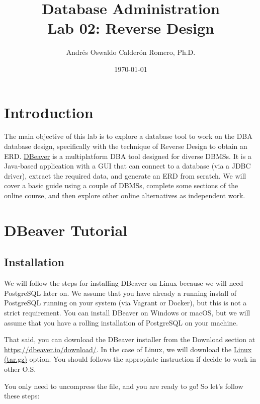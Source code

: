 \documentclass{article}
\title{Database Administration \\ Lab 02: Reverse Design}
\author{Andrés Oswaldo Calderón Romero, Ph.D.}
\date{\today}
\begin{document}
\maketitle

\section{Introduction}
The main objective of this lab is to explore a database tool to work on the DBA database design, specifically with the technique of Reverse Design to obtain an ERD. \href{https://dbeaver.io/}{DBeaver} is a multiplatform DBA tool designed for diverse DBMSs. It is a Java-based application with a GUI that can connect to a database (via a JDBC driver), extract the required data, and generate an ERD from scratch. We will cover a basic guide using a couple of DBMSs, complete some sections of the online course, and then explore other online alternatives as independent work.


\section{DBeaver Tutorial}
\subsection{Installation}
We will follow the steps for installing DBeaver on Linux because we will need PostgreSQL later on. We assume that you have already a running install of PostgreSQL running on your system (via Vagrant or Docker), but this is not a strict requirement. You can install DBeaver on Windows or macOS, but we will assume that you have a rolling installation of PostgreSQL on your machine.

That said, you can download the DBeaver installer from the Download section at \url{https://dbeaver.io/download/}. In the case of Linux, we will download the \href{https://dbeaver.io/files/dbeaver-ce-latest-linux.gtk.x86_64.tar.gz}{Linux (tar.gz)} option.  You should follows the appropiate instruction if decide to work in other O.S.

You only need to uncompress the file, and you are ready to go! So let's follow these steps:
\end{document}
